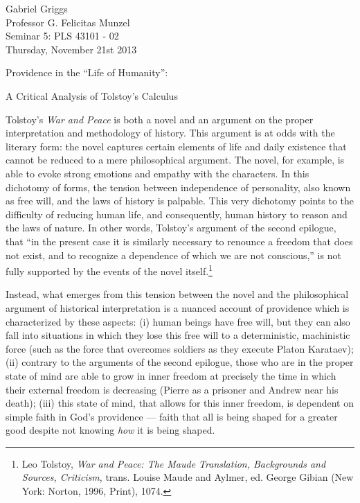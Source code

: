 \documentclass[12pt]{article}
\begin{document}
{\raggedleft{}Gabriel Griggs} \\
Professor G. Felicitas Munzel \\
Seminar 5: PLS 43101 - 02 \\
Thursday, November 21st 2013\\
\centerline{Providence in the ``Life of Humanity'':}
\centerline{A Critical Analysis of Tolstoy's Calculus}
 

Tolstoy's \emph{War and Peace} is both a novel and an argument on the proper interpretation and methodology of history. This argument is at odds with the literary form: the novel captures certain elements of life and daily existence that cannot be reduced to a mere philosophical argument. The novel, for example, is able to evoke strong emotions and empathy with the characters. In this dichotomy of forms, the tension between independence of personality, also known as free will, and the laws of history is palpable. This very dichotomy points to the difficulty of reducing human life, and consequently, human history to reason and the laws of nature. In other words, Tolstoy's argument of the second epilogue, that ``in the present case it is similarly necessary to renounce a freedom that does not exist, and to recognize a dependence of which we are not conscious,'' is not fully supported by the events of the novel itself.\footnote{Leo Tolstoy, \emph{War and Peace: The Maude Translation, Backgrounds and Sources, Criticism}, trans. Louise Maude and Aylmer, ed. George Gibian (New York: Norton, 1996, Print), 1074.}

Instead, what emerges from this tension between the novel and the philosophical argument of historical interpretation is a nuanced account of providence which is characterized by these aspects: (i) human beings have free will, but they can also fall into situations in which they lose this free will to a deterministic, machinistic force (such as the force that overcomes soldiers as they execute Platon Karataev); (ii) contrary to the arguments of the second epilogue, those who are in the proper state of mind are able to grow in inner freedom at precisely the time in which their external freedom is decreasing (Pierre as a prisoner and Andrew near his death); (iii) this state of mind, that allows for this inner freedom, is dependent on simple faith in God's providence --- faith that all is being shaped for a greater good despite not knowing \emph{how} it is being shaped.
\end{document}
